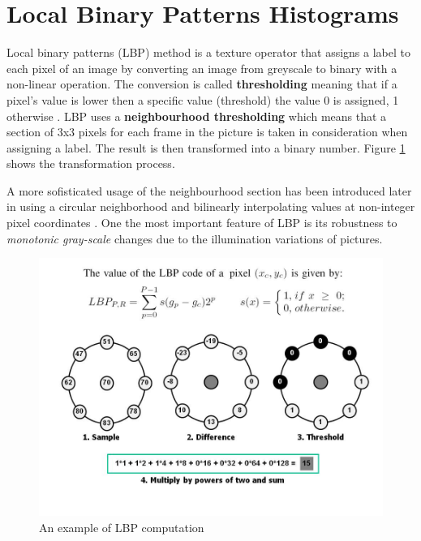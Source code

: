 \documentclass{report}
\begin{document}
\section{Local Binary Patterns Histograms}
Local binary patterns (LBP) method is a texture operator that assigns a label to each pixel of an image by converting an image from greyscale to binary with a non-linear operation. The conversion is called \textbf{thresholding} meaning that if a pixel's value is lower then a specific value (threshold) the value 0 is assigned, 1 otherwise \cite{thresholding}. LBP uses a \textbf{neighbourhood thresholding} which means that a section of 3x3 pixels for each frame in the picture is taken in consideration when assigning a label. The result is then transformed into a binary number. Figure \ref{fig:lbp-comp} shows the transformation process.

A more sofisticated usage of the neighbourhood section has been introduced later in \cite{ojala2002multiresolution} using a circular neighborhood and bilinearly interpolating values at non-integer pixel coordinates \cite{lbp-scholar}.
One the most important feature of LBP is its robustness to \textit{monotonic gray-scale} changes due to the illumination variations of pictures.

\begin{figure}[!htb]
  \centering
  \includegraphics[scale=0.5]{images/lbp-computation.png}
  \caption{An example of LBP computation\cite{lbp-scholar}}
  \label{fig:lbp-comp}
\end{figure}
\end{document}
